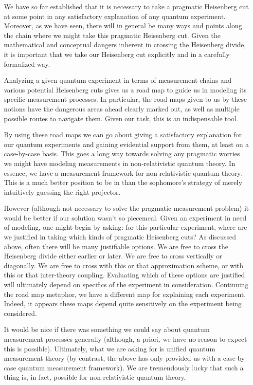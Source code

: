\documentclass[12pt,prd,superscriptaddress,floatfix,amsmath,amssymb,amsfonts,nofootinbib]{revtex4-2}
\begin{document}
We have so far established that it is necessary to take a pragmatic Heisenberg cut at some point in any satisfactory explanation of any quantum experiment. Moreover, as we have seen, there will in general be many ways and points along the chain where we might take this pragmatic Heisenberg cut. Given the mathematical and conceptual dangers inherent in crossing the Heisenberg divide, it is important that we take our Heisenberg cut explicitly and in a carefully formalized way. 

Analyzing a given quantum experiment in terms of measurement chains and various potential Heisenberg cuts gives us a road map to guide us in modeling its specific measurement processes. In particular, the road maps given to us by these notions have the dangerous areas ahead clearly marked out, as well as multiple possible routes to navigate them. Given our task, this is an indispensable tool.

By using these road maps we can go about giving a satisfactory explanation for our quantum experiments and gaining evidential support from them, at least on a case-by-case basis. This goes a long way towards solving any pragmatic worries we might have modeling measurements in non-relativistic quantum theory. In essence, we have a measurement framework for non-relativistic quantum theory. This is a much better position to be in than the sophomore's strategy of merely intuitively guessing the right projector.

However (although not necessary to solve the pragmatic measurement problem) it would be better if our solution wasn't so piecemeal. Given an experiment in need of modeling, one might begin by asking: for this particular experiment, where are we justified in taking which kinds of pragmatic Heisenberg cuts? As discussed above, often there will be many justifiable options. We are free to cross the Heisenberg divide either earlier or later. We are free to cross vertically or diagonally. We are free to cross with this or that approximation scheme, or with this or that inter-theory coupling. Evaluating which of these options are justified will ultimately depend on specifics of the experiment in consideration. Continuing the road map metaphor, we have a different map for explaining each experiment. Indeed, it appears these maps depend quite sensitively on the experiment being considered.

It would be nice if there was something we could say about quantum measurement processes generally (although, a priori, we have no reason to expect this is possible). Ultimately, what we are asking for is unified quantum measurement theory (by contrast, the above has only provided us with a case-by-case quantum measurement framework). We are tremendously lucky that such a thing is, in fact, possible for non-relativistic quantum theory.
\end{document}
